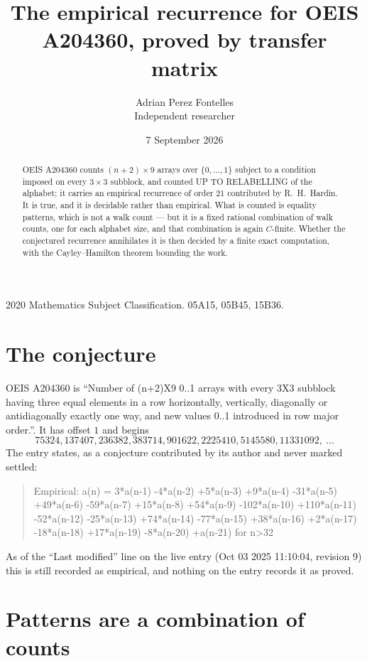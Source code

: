 \documentclass[11pt,a4paper]{article}
\title{The empirical recurrence for OEIS A204360, proved by transfer matrix}
\author{Adrian Perez Fontelles\\ \small Independent researcher}
\date{7 September 2026}
\theoremstyle{plain}
\theoremstyle{definition}
\begin{document}
\maketitle

\begin{abstract}
OEIS A204360 counts $(n+2)\times9$ arrays over $\{0,\dots,1\}$ subject to a condition imposed on
every $3\times3$ subblock, and counted UP TO RELABELLING of the
alphabet; it carries an empirical recurrence of order $21$ contributed by
R.~H.~Hardin. It is true, and it is decidable rather than empirical. What is counted is
equality patterns, which is not a walk count --- but it is a fixed rational combination of
walk counts, one for each alphabet size, and that combination is again $C$-finite. Whether the
conjectured recurrence annihilates it is then decided by a finite exact computation, with the
Cayley--Hamilton theorem bounding the work.
\end{abstract}

\noindent\small 2020 Mathematics Subject Classification. 05A15, 05B45, 15B36.\normalsize

\section{The conjecture}

OEIS A204360 is ``Number of (n+2)X9 0..1 arrays with every 3X3 subblock having three equal elements in a row horizontally, vertically, diagonally or antidiagonally exactly one way, and new values 0..1 introduced in row major order.''. It has offset $1$ and begins
\[
75324, 137407, 236382, 383714, 901622, 2225410, 5145580, 11331092,\ \dots
\]
The entry states, as a conjecture contributed by its author and never marked settled:
\begin{quote}
Empirical: a(n) = 3*a(n-1) -4*a(n-2) +5*a(n-3) +9*a(n-4) -31*a(n-5) +49*a(n-6) -59*a(n-7) +15*a(n-8) +54*a(n-9) -102*a(n-10) +110*a(n-11) -52*a(n-12) -25*a(n-13) +74*a(n-14) -77*a(n-15) +38*a(n-16) +2*a(n-17) -18*a(n-18) +17*a(n-19) -8*a(n-20) +a(n-21) for n>32
\end{quote}
As of the ``Last modified'' line on the live entry (Oct 03 2025 11:10:04, revision 9) this is still
recorded as empirical, and nothing on the entry records it as proved.

\section{Patterns are a combination of counts}
\end{document}
